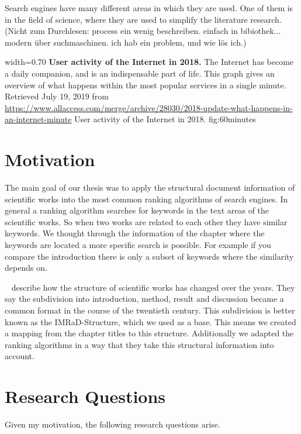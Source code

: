 Search engines have many different areas in which they are used. One of them is in the field of science, where they are used to simplify the literature research. (Nicht zum Durchlesen: process ein wenig beschreiben. einfach in bibiothek... modern über suchmaschinen. ich hab ein problem, und wie lös ich.)


      {width=0.70\textwidth}
      {\textbf{User activity of the Internet in 2018.} The Internet has become a daily companion, and is an indispensable part of life. This graph gives an overview of what happens within the most popular services in a single minute. Retrieved July 19, 2019 from \url{https://www.allaccess.com/merge/archive/28030/2018-update-what-happens-in-an-internet-minute}}
      {User activity of the Internet in 2018.}
      {fig:60minutes}

\section{Motivation}
\label{sec:Motivation}

The main goal of our thesis was to apply the structural document information of scientific works into the most common ranking algorithms of search engines. In general a ranking algorithm searches for keywords in the text areas of the scientific works. So when two works are related to each other they have similar keywords. We thought through the information of the chapter where the keywords are located a more specific search is possible. For example if you compare the introduction there is only a subset of keywords where the similarity depends on.

 ~\cite{Sollaci-The-2004} describe how the structure of scientific works has changed over the years. They say the subdivision into introduction, method, result and discussion became a common format in the course of the twentieth century. This subdivision is better known as the IMRaD-Structure, which we used as a base. This means we created a mapping from the chapter titles to this structure. Additionally we adapted the ranking algorithms in a way that they take this structural information into account.


\section{Research Questions}
\label{sec:research_questions}

Given my motivation, the following research questions arise.

